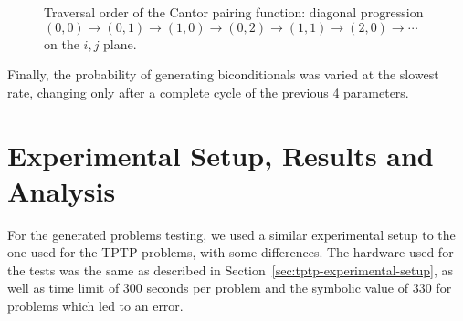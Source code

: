 \begin{figure}[H]
  \centering
  \caption{Traversal order of the Cantor pairing function: diagonal progression \((0,0)\to(0,1)\to(1,0)\to(0,2)\to(1,1)\to(2,0)\to\cdots\) on the \(i,j\) plane.}\label{fig:cantor-pairing-diagonal}
\end{figure}

Finally, the probability of generating biconditionals was varied at the slowest rate, changing only after a complete cycle of the previous 4 parameters.

\section{Experimental Setup, Results and Analysis}\label{sec:results-analysis}

For the generated problems testing, we used a similar experimental setup to the one used for the TPTP problems, with some differences.
The hardware used for the tests was the same as described in Section~\ref{sec:tptp-experimental-setup}, as well as time limit of \(300\) seconds per problem and the symbolic value of \(330\) for problems which led to an error.

